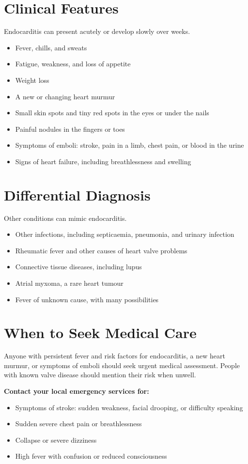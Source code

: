 \section*{Clinical Features}
Endocarditis can present acutely or develop slowly over weeks.
\begin{itemize}
    \item Fever, chills, and sweats
    \item Fatigue, weakness, and loss of appetite
    \item Weight loss
    \item A new or changing heart murmur
    \item Small skin spots and tiny red spots in the eyes or under the nails
    \item Painful nodules in the fingers or toes
    \item Symptoms of emboli: stroke, pain in a limb, chest pain, or blood in the urine
    \item Signs of heart failure, including breathlessness and swelling
\end{itemize}

\section*{Differential Diagnosis}
Other conditions can mimic endocarditis.
\begin{itemize}
    \item Other infections, including septicaemia, pneumonia, and urinary infection
    \item Rheumatic fever and other causes of heart valve problems
    \item Connective tissue diseases, including lupus
    \item Atrial myxoma, a rare heart tumour
    \item Fever of unknown cause, with many possibilities
\end{itemize}

\section*{When to Seek Medical Care}
Anyone with persistent fever and risk factors for endocarditis, a new heart murmur, or symptoms of emboli should seek urgent medical assessment. People with known valve disease should mention their risk when unwell.

\textbf{Contact your local emergency services for:}
\begin{itemize}
    \item Symptoms of stroke: sudden weakness, facial drooping, or difficulty speaking
    \item Sudden severe chest pain or breathlessness
    \item Collapse or severe dizziness
    \item High fever with confusion or reduced consciousness
\end{itemize}


